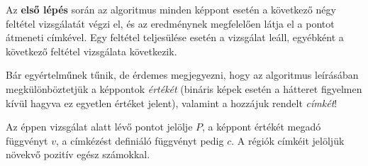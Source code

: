 Az \textbf{első lépés} során az algoritmus minden képpont esetén a következő négy feltétel vizsgálatát végzi el, és az eredménynek megfelelően látja el a pontot átmeneti címkével. Egy feltétel teljesülése esetén a vizsgálat leáll, egyébként a következő feltétel vizsgálata következik.

Bár egyértelműnek tűnik, de érdemes megjegyezni, hogy az algoritmus leírásában megkülönböztetjük a képpontok \emph{értékét} (bináris képek esetén a hátteret figyelmen kívül hagyva ez egyetlen értéket jelent), valamint a hozzájuk rendelt \emph{címkét}!

\bigskip

Az éppen vizsgálat alatt lévő pontot jelölje $P$, a képpont értékét megadó függvényt $v$, a címkézést definiáló függvényt pedig $c$. A régiók címkéit jelöljük növekvő pozitív egész számokkal.

